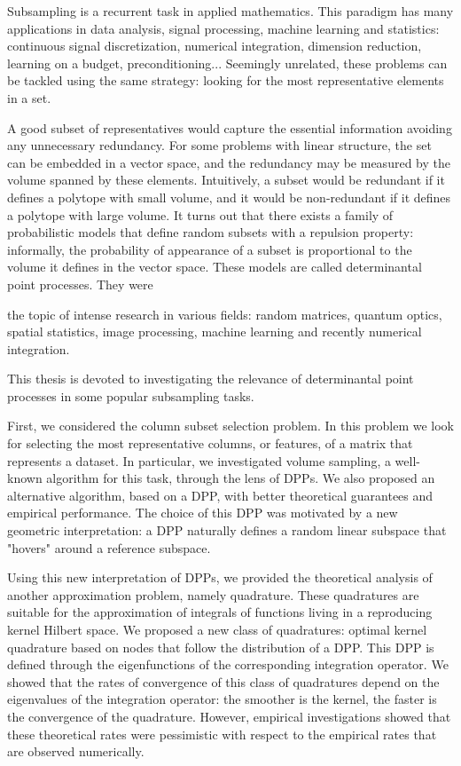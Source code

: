 \documentclass[twoside,11pt]{book}
\numberwithin{theorem}{chapter}
\numberwithin{definition}{chapter}
\numberwithin{proposition}{chapter}
\numberwithin{corollary}{chapter}
\numberwithin{example}{chapter}
\numberwithin{lemma}{chapter}
\numberwithin{assumption}{chapter}
\numberwithin{equation}{chapter}
\numberwithin{figure}{chapter}
\begin{document}
Subsampling is a recurrent task in applied mathematics. This paradigm has many applications in data analysis, signal processing, machine learning and statistics: continuous signal discretization, numerical integration, dimension reduction, learning on a budget, preconditioning... Seemingly unrelated, these problems can be tackled using the same strategy: looking for the most representative elements in a set. 
 
A good subset of representatives would capture the essential information avoiding any unnecessary redundancy. For some problems with linear structure, the set can be embedded in a vector space, and 
 the redundancy may be measured by the volume spanned by these elements. Intuitively, a subset would be redundant if it defines a polytope with small volume, and it would be non-redundant if it defines a polytope with large volume. It turns out that there exists a family of probabilistic models that define random subsets with a repulsion property: informally, the probability of appearance of a subset is proportional to the volume it defines in the vector space. These models are called determinantal point processes. They were

 the topic of intense research in various fields: random matrices, quantum optics, spatial statistics, image processing, machine learning and recently numerical integration. 
 
This thesis is devoted to investigating the relevance of determinantal point processes in some popular subsampling tasks.

First, we considered the column subset selection problem. In this problem we look for selecting the most representative columns, or features, of a matrix that represents a dataset. In particular, we investigated volume sampling, a well-known algorithm for this task, through the lens of DPPs. We also proposed an alternative algorithm, based on a DPP, with better theoretical guarantees and empirical performance. The choice of this DPP was motivated by a new geometric interpretation: a DPP naturally defines a random linear subspace that "hovers" around a reference  subspace. 

Using this new interpretation of DPPs, we provided the theoretical analysis of another approximation problem, namely quadrature. These quadratures are suitable for the approximation of integrals of functions living in a reproducing kernel Hilbert space. We proposed a new class of quadratures: optimal kernel quadrature based on nodes that follow the distribution of a DPP. This DPP is defined through the eigenfunctions of the corresponding integration operator. We showed that the rates of convergence of this class of quadratures depend on the eigenvalues of the integration operator: the smoother is the kernel, the faster is the convergence of the quadrature. However, empirical investigations showed that these theoretical rates were pessimistic with respect to the empirical rates that are observed numerically.
\end{document}
